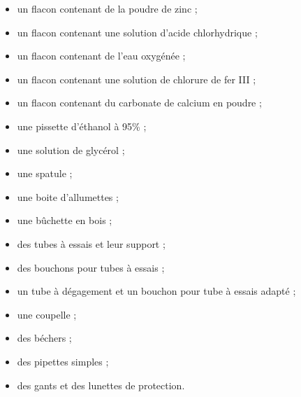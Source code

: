 \begin{mdframed}[style=autreexo]
\textbf{}
\begin{itemize}
    \item un flacon contenant de la poudre de zinc ;
    \item un flacon contenant une solution d’acide chlorhydrique ;
    \item un flacon contenant de l’eau oxygénée ;
    \item un flacon contenant une solution de chlorure de fer III ;
    \item un flacon contenant du carbonate de calcium en poudre ;
    \item une pissette d'éthanol à 95\% ;
    \item une solution de glycérol ;
    \item une spatule ;
    \item une boite d’allumettes ;
    \item une bûchette en bois ;
    \item des tubes à essais et leur support ;
    \item des bouchons pour tubes à essais ;
    \item un tube à dégagement et un bouchon pour tube à essais adapté ;
    \item une coupelle ;
    \item des béchers ;
    \item des pipettes simples ;
	\item des gants et des lunettes de protection.
 
\end{itemize}
\end{mdframed}

\newpage

